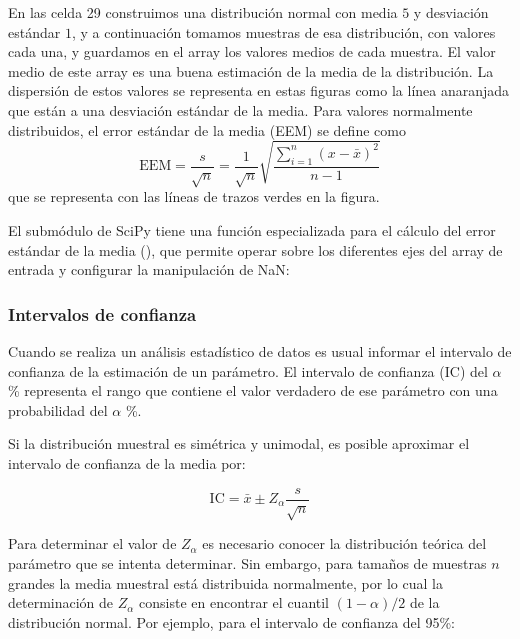 En las celda 29 construimos una distribución normal con media $5$ y desviación estándar $1$, y a continuación tomamos  muestras de esa distribución, con  valores cada una, y guardamos en el array  los valores medios de cada muestra. El valor medio de este array es una buena estimación de la media de la distribución. La dispersión de estos valores se representa en estas figuras como la línea anaranjada que están a una desviación estándar de la media. Para valores normalmente distribuidos, el error estándar de la media (EEM) se define como
\begin{equation}
 \text{EEM} = \frac{s}{\sqrt{n}} = \frac{1}{\sqrt{n}} \sqrt{\frac{\sum_{i=1}^n (x - \bar{x})^2}{n-1}}
\end{equation}
que se representa con las líneas de trazos verdes en la figura.


El submódulo  de SciPy tiene una función especializada para el cálculo del error estándar de la media (), que permite operar sobre los diferentes ejes del array de entrada y configurar la manipulación de NaN:


\subsubsection{Intervalos de confianza}

Cuando se realiza un análisis estadístico de datos es usual informar el intervalo de confianza de la estimación de un parámetro. El intervalo de confianza (IC) del $\alpha$\% representa el rango que contiene el valor verdadero de ese parámetro con una probabilidad del $\alpha$ \%.

Si la distribución muestral es simétrica y unimodal, es posible aproximar el intervalo de confianza de la media por:

\[ \text{IC} = \bar{x} \pm Z_{\alpha} \frac{s}{\sqrt{n}}  \]

Para determinar el valor de $Z_{\alpha}$ es necesario conocer la distribución teórica del parámetro que se intenta determinar. Sin embargo, para tamaños de muestras $n$ grandes la media muestral está distribuida normalmente, por lo cual la determinación de $Z_{\alpha}$ consiste en encontrar el cuantil $(1-\alpha)/2$ de la distribución normal. Por ejemplo, para el intervalo de confianza del 95\%:

